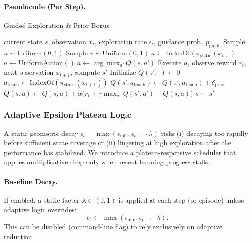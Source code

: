 \paragraph{Pseudocode (Per Step).}
\begin{algorithm}[H]
\caption{Guided Exploration \& Prior Bonus}
\label{alg:qlearn-guided}
\begin{algorithmic}[1]
\Require current state $s$, observation $x_t$, exploration rate $\epsilon_t$, guidance prob.\ $p_{\text{guide}}$
\State Sample $u \sim \text{Uniform}(0,1)$
   \State Sample $v \sim \text{Uniform}(0,1)$
       \State $a \gets \text{IndexOf}(\pi_{\text{static}}(x_t))$
   \Else
       \State $a \gets \text{UniformAction}()$
   \EndIf
\Else
   \State $a \gets \arg\max_{a'} Q(s,a')$
\EndIf
\State Execute $a$, observe reward $r_t$, next observation $x_{t+1}$, compute $s'$
   \State Initialize $Q(s',\cdot) \gets 0$
   \State $a_{\text{teach}} \gets \text{IndexOf}(\pi_{\text{static}}(x_{t+1}))$
   \State $Q(s', a_{\text{teach}}) \gets Q(s', a_{\text{teach}}) + \delta_{\text{prior}}$
\EndIf
\State $Q(s,a) \gets Q(s,a) + \alpha \big(r_t + \gamma \max_{a'} Q(s',a') - Q(s,a)\big)$
\State $s \gets s'$
\end{algorithmic}
\end{algorithm}

\subsubsection{Adaptive Epsilon Plateau Logic}
\label{subsubsec:qlearn-adaptive-eps}

A static geometric decay $\epsilon_t = \max(\epsilon_{\min}, \epsilon_{t-1}\cdot \lambda)$ risks (i) decaying too rapidly before sufficient state coverage or (ii) lingering at high exploration after the performance has stabilized. We introduce a plateau-responsive scheduler that applies multiplicative drop only when recent learning progress stalls.

\paragraph{Baseline Decay.}
If enabled, a static factor $\lambda \in (0,1)$ is applied at each step (or episode) unless adaptive logic overrides:
\[
\epsilon_t \leftarrow \max(\epsilon_{\min}, \epsilon_{t-1} \cdot \lambda).
\]
This can be disabled (command-line flag) to rely exclusively on adaptive reduction.

